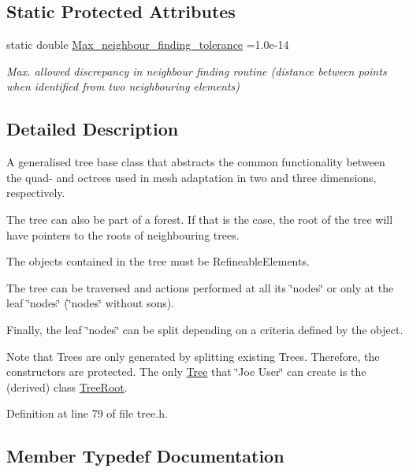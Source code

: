 \subsection*{Static Protected Attributes}
\begin{DoxyCompactItemize}
\item 
static double \hyperlink{classoomph_1_1Tree_aef9abebc166fa3bf81ecb59ec0d5d6b2}{Max\+\_\+neighbour\+\_\+finding\+\_\+tolerance} =1.\+0e-\/14
\begin{DoxyCompactList}\small\item\em Max. allowed discrepancy in neighbour finding routine (distance between points when identified from two neighbouring elements) \end{DoxyCompactList}\end{DoxyCompactItemize}


\subsection{Detailed Description}
A generalised tree base class that abstracts the common functionality between the quad-\/ and octrees used in mesh adaptation in two and three dimensions, respectively.

The tree can also be part of a forest. If that is the case, the root of the tree will have pointers to the roots of neighbouring trees.

The objects contained in the tree must be Refineable\+Elements.

The tree can be traversed and actions performed at all its \char`\"{}nodes\char`\"{} or only at the leaf \char`\"{}nodes\char`\"{} (\char`\"{}nodes\char`\"{} without sons).

Finally, the leaf \char`\"{}nodes\char`\"{} can be split depending on a criteria defined by the object.

Note that Trees are only generated by splitting existing Trees. Therefore, the constructors are protected. The only \hyperlink{classoomph_1_1Tree}{Tree} that \char`\"{}\+Joe User\char`\"{} can create is the (derived) class \hyperlink{classoomph_1_1TreeRoot}{Tree\+Root}. 

Definition at line 79 of file tree.\+h.



\subsection{Member Typedef Documentation}
\mbox{\label{classoomph_1_1Tree_af04461175b6345658a215ecf039eb69e}} 
